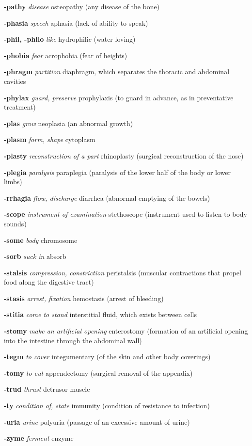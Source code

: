 \documentclass[10pt]{article}
\begin{document}
\begin{multicols}{2}
\begin{hangparas}{10pt}{1}
 \textbf{-pathy} \textit{disease} osteopathy (any disease of the bone) \par
 \textbf{-phasia} \textit{speech} aphasia (lack of ability to speak) \par
 \textbf{-phil, -philo} \textit{like} hydrophilic (water-loving) \par
 \textbf{-phobia} \textit{fear} acrophobia (fear of heights) \par
 \textbf{-phragm} \textit{partition} diaphragm, which separates the thoracic and abdominal cavities \par
 \textbf{-phylax} \textit{guard, preserve} prophylaxis (to guard in advance, as in preventative treatment) \par
 \textbf{-plas} \textit{grow} neoplasia (an abnormal growth) \par
 \textbf{-plasm} \textit{form, shape} cytoplasm \par
 \textbf{-plasty} \textit{reconstruction of a part} rhinoplasty (surgical reconstruction of the nose) \par
 \textbf{-plegia} \textit{paralysis} paraplegia (paralysis of the lower half of the body or lower limbs) \par
 \textbf{-rrhagia} \textit{flow, discharge} diarrhea (abnormal emptying of the bowels) \par
 \textbf{-scope} \textit{instrument of examination} stethoscope (instrument used to listen to body sounds) \par
 \textbf{-some} \textit{body} chromosome \par
 \textbf{-sorb} \textit{suck in} absorb \par
 \textbf{-stalsis} \textit{compression, constriction} peristalsis (muscular contractions that propel food along the digestive tract) \par
 \textbf{-stasis} \textit{arrest, fixation} hemostasis (arrest of bleeding) \par
 \textbf{-stitia} \textit{come to stand} interstitial fluid, which exists between cells \par
 \textbf{-stomy} \textit{make an artificial opening} enterostomy (formation of an artificial opening into the intestine through the abdominal wall) \par
 \textbf{-tegm} \textit{to cover} integumentary (of the skin and other body coverings) \par
 \textbf{-tomy} \textit{to cut} appendectomy (surgical removal of the appendix) \par
 \textbf{-trud} \textit{thrust} detrusor muscle \par
 \textbf{-ty} \textit{condition of, state} immunity (condition of resistance to infection) \par
 \textbf{-uria} \textit{urine} polyuria (passage of an excessive amount of urine) \par
 \textbf{-zyme} \textit{ferment} enzyme \par
  \end{hangparas}

 \end{multicols}
\end{document}
